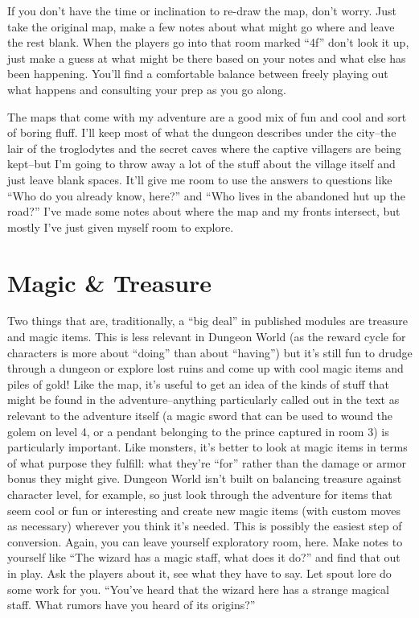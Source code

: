  If you don't have the time or inclination to re-draw the map, don't worry. Just take the original map, make a few notes about what might go where and leave the rest blank. When the players go into that room marked ``4f'' don't look it up, just make a guess at what might be there based on your notes and what else has been happening. You'll find a comfortable balance between freely playing out what happens and consulting your prep as you go along.


 The maps that come with my adventure are a good mix of fun and cool and sort of boring fluff. I'll keep most of what the dungeon describes under the city--the lair of the troglodytes and the secret caves where the captive villagers are being kept--but I'm going to throw away a lot of the stuff about the village itself and just leave blank spaces. It'll give me room to use the answers to questions like ``Who do you already know, here?'' and ``Who lives in the abandoned hut up the road?'' I've made some notes about where the map and my fronts intersect, but mostly I've just given myself room to explore.
\section{Magic \& Treasure}


 Two things that are, traditionally, a ``big deal'' in published modules are treasure and magic items. This is less relevant in Dungeon World (as the reward cycle for characters is more about ``doing'' than about ``having'') but it's still fun to drudge through a dungeon or explore lost ruins and come up with cool magic items and piles of gold! Like the map, it's useful to get an idea of the kinds of stuff that might be found in the adventure--anything particularly called out in the text as relevant to the adventure itself (a magic sword that can be used to wound the golem on level 4, or a pendant belonging to the prince captured in room 3) is particularly important. Like monsters, it's better to look at magic items in terms of what purpose they fulfill: what they're ``for'' rather than the damage or armor bonus they might give. Dungeon World isn't built on balancing treasure against character level, for example, so just look through the adventure for items that seem cool or fun or interesting and create new magic items (with custom moves as necessary) wherever you think it's needed. This is possibly the easiest step of conversion. Again, you can leave yourself exploratory room, here. Make notes to yourself like ``The wizard has a magic staff, what does it do?'' and find that out in play. Ask the players about it, see what they have to say. Let spout lore do some work for you. ``You've heard that the wizard here has a strange magical staff. What rumors have you heard of its origins?''
